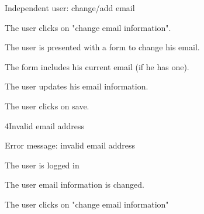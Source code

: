 \begin{uc}{Independent user: change/add email}

    \begin{uc-mss}
    \item The user clicks on "change email information".
    \item The user is presented with a form to change his email.
    \item The form includes his current email (if he has one).
    \item The user updates his email information.
    \item The user clicks on save.
    \end{uc-mss}

    \begin{uc-ext}

        \begin{uc-fail}{4}{Invalid email address}
        \item Error message: invalid email address
        \item {}
        \end{uc-fail}

    \end{uc-ext}

    \begin{uc-pre}
    \item The user is logged in
    \end{uc-pre}

    \begin{uc-post}
    \item The user email information is changed.
    \end{uc-post}

    \begin{uc-trig}
    \item The user clicks on "change email information"
    \end{uc-trig}

\end{uc}